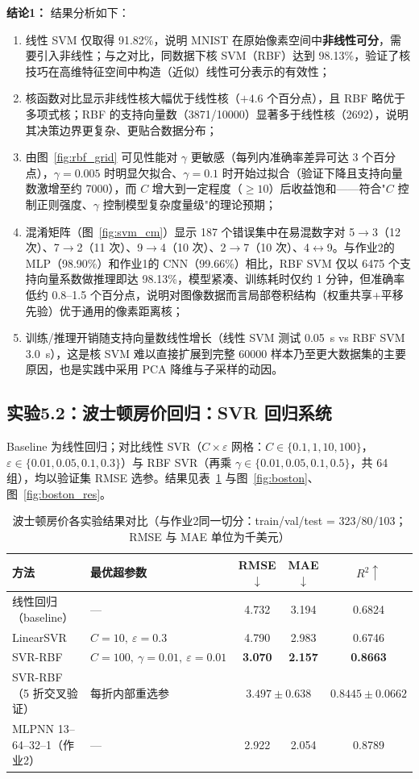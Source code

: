 \documentclass[UTF8,zihao=-4]{ctexart}
\newcommand{\mlExperiment}[2]{\subsection{实验#1：#2}}
\newcommand{\mlConclusion}[1]{\par\noindent\textbf{结论#1：}}
\begin{document}
\mlConclusion{1}
结果分析如下：
\begin{enumerate}
  \item 线性 SVM 仅取得 91.82\%，说明 MNIST 在原始像素空间中\textbf{非线性可分}，需要引入非线性；与之对比，同数据下核 SVM（RBF）达到 98.13\%，验证了核技巧在高维特征空间中构造（近似）线性可分表示的有效性；
  \item 核函数对比显示非线性核大幅优于线性核（$+4.6$ 个百分点），且 RBF 略优于多项式核；RBF 的支持向量数（3871/10000）显著多于线性核（2692），说明其决策边界更复杂、更贴合数据分布；
  \item 由图~\ref{fig:rbf_grid} 可见性能对 $\gamma$ 更敏感（每列内准确率差异可达 3 个百分点），$\gamma=0.005$ 时明显欠拟合、$\gamma=0.1$ 时开始过拟合（验证下降且支持向量数激增至约 7000），而 $C$ 增大到一定程度（$\ge 10$）后收益饱和——符合"$C$ 控制正则强度、$\gamma$ 控制模型复杂度量级"的理论预期；
  \item 混淆矩阵（图~\ref{fig:svm_cm}）显示 187 个错误集中在易混数字对 5$\to$3（12 次）、7$\to$2（11 次）、9$\to$4（10 次）、2$\to$7（10 次）、4$\leftrightarrow$9。与作业2的 MLP（98.90\%）和作业1的 CNN（99.66\%）相比，RBF SVM 仅以 6475 个支持向量系数做推理即达 98.13\%，模型紧凑、训练耗时仅约 1 分钟，但准确率低约 0.8--1.5 个百分点，说明对图像数据而言局部卷积结构（权重共享+平移先验）优于通用的像素距离核；
  \item 训练/推理开销随支持向量数线性增长（线性 SVM 测试 0.05~s vs RBF SVM 3.0~s），这是核 SVM 难以直接扩展到完整 60000 样本乃至更大数据集的主要原因，也是实践中采用 PCA 降维与子采样的动因。
\end{enumerate}

\mlExperiment{5.2}{波士顿房价回归：SVR 回归系统}
Baseline 为线性回归；对比线性 SVR（$C\times\varepsilon$ 网格：$C\in\{0.1,1,10,100\}$，$\varepsilon\in\{0.01,0.05,0.1,0.3\}$）与 RBF SVR（再乘 $\gamma\in\{0.01,0.05,0.1,0.5\}$，共 64 组），均以验证集 RMSE 选参。结果见表~\ref{tab:boston} 与图~\ref{fig:boston}、图~\ref{fig:boston_res}。

\begin{table}[H]
  \centering
  \caption{波士顿房价各实验结果对比（与作业2同一切分：train/val/test = 323/80/103；RMSE 与 MAE 单位为千美元）}
  \label{tab:boston}
  \footnotesize
  \begin{tabular}{llccc}
    \toprule
    方法 & 最优超参数 & RMSE$\downarrow$ & MAE$\downarrow$ & $R^2\uparrow$ \\
    \midrule
    线性回归（baseline） & --- & 4.732 & 3.194 & 0.6824 \\
    LinearSVR & $C=10,\ \varepsilon=0.3$ & 4.790 & 2.983 & 0.6746 \\
    SVR-RBF & $C=100,\ \gamma=0.01,\ \varepsilon=0.01$ & \textbf{3.070} & \textbf{2.157} & \textbf{0.8663} \\
    \midrule
    SVR-RBF（5 折交叉验证） & 每折内部重选参 & \multicolumn{2}{c}{$3.497\pm0.638$} & $0.8445\pm0.0662$ \\
    \midrule
    MLPNN 13--64--32--1（作业2） & --- & 2.922 & 2.054 & 0.8789 \\
    \bottomrule
  \end{tabular}
\end{table}
\end{document}
